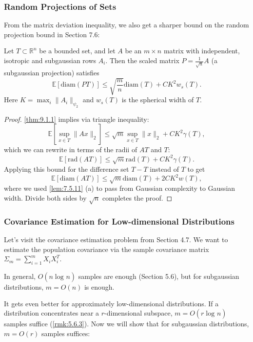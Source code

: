 \subsubsection{Random Projections of Sets}
From the matrix deviation inequality, we also get a sharper bound on the random projection bound in Section 7.6:

\begin{proposition}
\label{prop:9.2.1}
Let $T \subset \mathbb{R}^n$ be a bounded set, and let $A$ be an $m \times n$ matrix with independent, isotropic 
and subgaussian rows $A_i$. Then the scaled matrix $P = \frac{1}{\sqrt{n}}A$ (a subgaussian projection) satisfies
\[ \mathbb{E}\left[ \mathrm{diam}(PT) \right] \leq \sqrt{\frac{m}{n}}\mathrm{diam}(T) + CK^2 w_s(T). \]
Here $K = \max_{i}\lVert A_i \rVert_{\psi_2}$ and $w_s(T)$ is the spherical width of $T$.
\end{proposition}


\begin{proof}
\cref{thm:9.1.1} implies via triangle inequality:
\[ \mathbb{E}\left[ \sup_{x \in T}\lVert Ax \rVert_{2} \right] \leq \sqrt{m}\sup_{x \in T}\lVert x \rVert_{2} 
+ CK^2 \gamma(T), \]
which we can rewrite in terms of the radii of $AT$ and $T$:
\[ \mathbb{E}\left[ \mathrm{rad}(AT) \right] \leq \sqrt{m}\mathrm{rad}(T) + CK^2 \gamma(T). \]
Applying this bound for the difference set $T - T$ instead of $T$ to get 
\[ \mathbb{E}\left[ \mathrm{diam}(AT) \right] \leq \sqrt{m}\mathrm{diam}(T) + 2CK^2w(T), \]
where we used \cref{lem:7.5.11} (a) to pass from Gaussian complexity to Gaussian width. Divide both sides by 
$\sqrt{n}$ completes the proof.
\end{proof}


\subsubsection{Covariance Estimation for Low-dimensional Distributions}
Let's visit the covariance estimation problem from Section 4.7. We want to estimate the population covariance 
via the sample covariance matrix $\Sigma_m = \sum_{i = 1}^{m}X_iX_i^T$.

In general, $O(n \log_{}{n})$ samples are enough (Section 5.6), but for subgaussian distributions, $m = O(n)$ 
is enough.

It gets even better for approximately low-dimensional distributions. If a distribution concentrates near a 
$r$-dimensional subspace, $m = O(r \log_{}{n})$ samples suffice (\cref{rmk:5.6.3}). Now we will show that for 
subgaussian distributions, $m = O(r)$ samples suffices:

